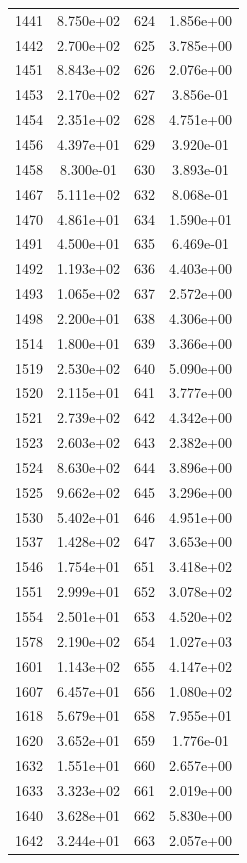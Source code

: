 \documentclass[12pt]{article}
\begin{document}
\begin{longtable}{@{}cccc@{}}
1441 & 8.750e+02 & 624 & 1.856e+00 \\
1442 & 2.700e+02 & 625 & 3.785e+00 \\
1451 & 8.843e+02 & 626 & 2.076e+00 \\
1453 & 2.170e+02 & 627 & 3.856e-01 \\
1454 & 2.351e+02 & 628 & 4.751e+00 \\
1456 & 4.397e+01 & 629 & 3.920e-01 \\
1458 & 8.300e-01 & 630 & 3.893e-01 \\
1467 & 5.111e+02 & 632 & 8.068e-01 \\
1470 & 4.861e+01 & 634 & 1.590e+01 \\
1491 & 4.500e+01 & 635 & 6.469e-01 \\
1492 & 1.193e+02 & 636 & 4.403e+00 \\
1493 & 1.065e+02 & 637 & 2.572e+00 \\
1498 & 2.200e+01 & 638 & 4.306e+00 \\
1514 & 1.800e+01 & 639 & 3.366e+00 \\
1519 & 2.530e+02 & 640 & 5.090e+00 \\
1520 & 2.115e+01 & 641 & 3.777e+00 \\
1521 & 2.739e+02 & 642 & 4.342e+00 \\
1523 & 2.603e+02 & 643 & 2.382e+00 \\
1524 & 8.630e+02 & 644 & 3.896e+00 \\
1525 & 9.662e+02 & 645 & 3.296e+00 \\
1530 & 5.402e+01 & 646 & 4.951e+00 \\
1537 & 1.428e+02 & 647 & 3.653e+00 \\
1546 & 1.754e+01 & 651 & 3.418e+02 \\
1551 & 2.999e+01 & 652 & 3.078e+02 \\
1554 & 2.501e+01 & 653 & 4.520e+02 \\
1578 & 2.190e+02 & 654 & 1.027e+03 \\
1601 & 1.143e+02 & 655 & 4.147e+02 \\
1607 & 6.457e+01 & 656 & 1.080e+02 \\
1618 & 5.679e+01 & 658 & 7.955e+01 \\
1620 & 3.652e+01 & 659 & 1.776e-01 \\
1632 & 1.551e+01 & 660 & 2.657e+00 \\
1633 & 3.323e+02 & 661 & 2.019e+00 \\
1640 & 3.628e+01 & 662 & 5.830e+00 \\
1642 & 3.244e+01 & 663 & 2.057e+00 \\

\end{longtable}
\end{document}
